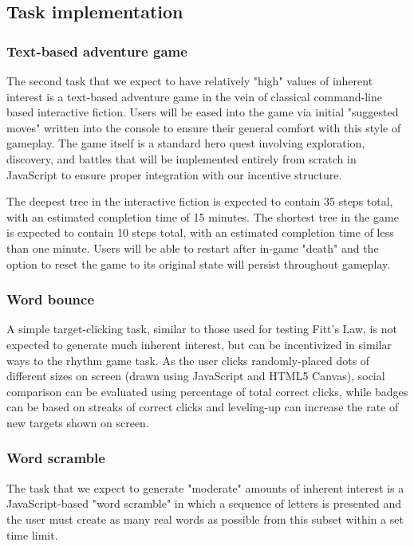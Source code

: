 \subsection{Task implementation}
\subsubsection{Text-based adventure game}
The second task that we expect to have relatively "high" values of inherent interest is a text-based adventure game in the vein of classical command-line based interactive fiction. Users will be eased into the game via initial "suggested moves" written into the console to ensure their general comfort with this style of gameplay. The game itself is a standard hero quest involving exploration, discovery, and battles that will be implemented entirely from scratch in JavaScript to ensure proper integration with our incentive structure.

The deepest tree in the interactive fiction is expected to contain 35 steps total, with an estimated completion time of 15 minutes. The shortest tree in the game is expected to contain 10 steps total, with an estimated completion time of less than one minute. Users will be able to restart after in-game "death" and the option to reset the game to its original state will persist throughout gameplay.
\subsubsection{Word bounce}
A simple target-clicking task, similar to those used for testing Fitt's Law, is not expected to generate much inherent interest, but can be incentivized in similar ways to the rhythm game task. As the user clicks randomly-placed dots of different sizes on screen (drawn using JavaScript and HTML5 Canvas), social comparison can be evaluated using percentage of total correct clicks, while badges can be based on streaks of correct clicks and leveling-up can increase the rate of new targets shown on screen.
\subsubsection{Word scramble}
The task that we expect to generate "moderate" amounts of inherent interest is a JavaScript-based "word scramble" in which a sequence of letters is presented and the user must create as many real words as possible from this subset within a set time limit.
